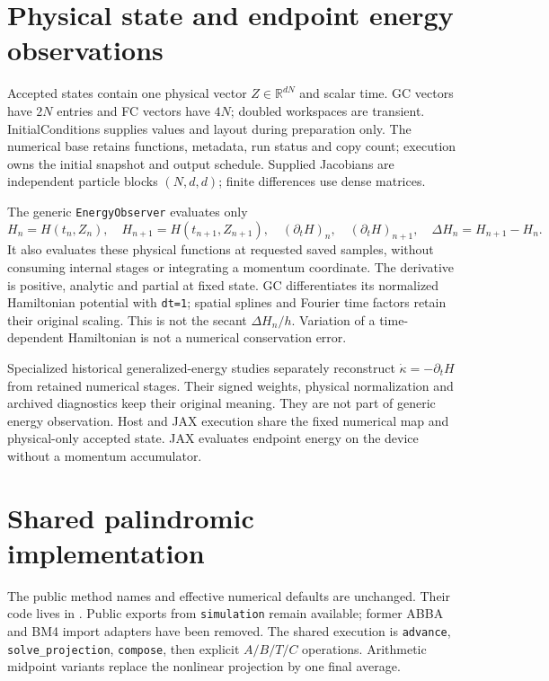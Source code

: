 \documentclass[11pt,a4paper]{article}
\begin{document}
\section{Physical state and endpoint energy observations}
Accepted states contain one physical vector $Z\in\mathbb{R}^{dN}$ and scalar time.
GC vectors have $2N$ entries and FC vectors have $4N$; doubled workspaces are
transient. InitialConditions supplies values and layout during preparation only.
The numerical base retains functions, metadata, run status and copy count;
execution owns the initial snapshot and output schedule. Supplied Jacobians are
independent particle blocks $(N,d,d)$; finite differences use dense matrices.

The generic \texttt{EnergyObserver} evaluates only
\[
 H_n=H(t_n,Z_n),\quad H_{n+1}=H(t_{n+1},Z_{n+1}),\quad
 (\partial_tH)_n,\quad (\partial_tH)_{n+1},\quad
 \Delta H_n=H_{n+1}-H_n.
\]
It also evaluates these physical functions at requested saved samples, without
consuming internal stages or integrating a momentum coordinate. The derivative
is positive, analytic and partial at fixed state. GC differentiates its normalized
Hamiltonian potential with \texttt{dt=1}; spatial splines and Fourier time factors
retain their original scaling. This is not the secant $\Delta H_n/h$.
Variation of a time-dependent Hamiltonian is not a numerical conservation error.

Specialized historical generalized-energy studies separately reconstruct
$\dot\kappa=-\partial_tH$ from retained numerical stages. Their signed weights,
physical normalization and archived diagnostics keep their original meaning.
They are not part of generic energy observation. Host and JAX execution share
the fixed numerical map and physical-only accepted state. JAX evaluates endpoint
energy on the device without a momentum accumulator.

\section{Shared palindromic implementation}
The public method names and effective numerical defaults are unchanged. Their code
lives in . Public exports from \texttt{simulation}
remain available; former ABBA and BM4 import adapters have been removed.
The shared execution is
\texttt{advance}, \texttt{solve\_projection}, \texttt{compose}, then
explicit $A/B/T/C$ operations. Arithmetic midpoint variants
replace the nonlinear projection by one final average.
\end{document}
